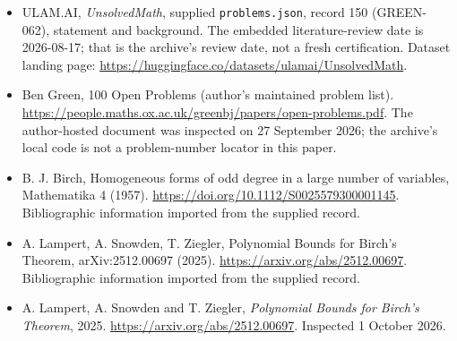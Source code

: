 \documentclass[11pt,a4paper]{article}
\begin{document}
{\small

\begin{itemize}

\item[\hypertarget{source:150:1}{S1}] ULAM.AI, \emph{UnsolvedMath}, supplied \texttt{problems.json}, record 150 (GREEN-062), statement and background. The embedded literature-review date is 2026-08-17; that is the archive’s review date, not a fresh certification. Dataset landing page: \url{https://huggingface.co/datasets/ulamai/UnsolvedMath}.

\item[\hypertarget{source:150:2}{S2}] Ben Green, 100 Open Problems (author’s maintained problem list). \url{https://people.maths.ox.ac.uk/greenbj/papers/open-problems.pdf}. The author-hosted document was inspected on 27 September 2026; the archive’s local code is not a problem-number locator in this paper.

\item[\hypertarget{source:150:3}{S3}] B. J. Birch, Homogeneous forms of odd degree in a large number of variables, Mathematika 4 (1957). \url{https://doi.org/10.1112/S0025579300001145}. Bibliographic information imported from the supplied record.

\item[\hypertarget{source:150:4}{S4}] A. Lampert, A. Snowden, T. Ziegler, Polynomial Bounds for Birch's Theorem, arXiv:2512.00697 (2025). \url{https://arxiv.org/abs/2512.00697}. Bibliographic information imported from the supplied record.

\item[E1] A. Lampert, A. Snowden and T. Ziegler, \emph{Polynomial Bounds for Birch's Theorem}, 2025. \url{https://arxiv.org/abs/2512.00697}. Inspected 1 October 2026.

\end{itemize}

}

\label{end:150}
\end{document}

